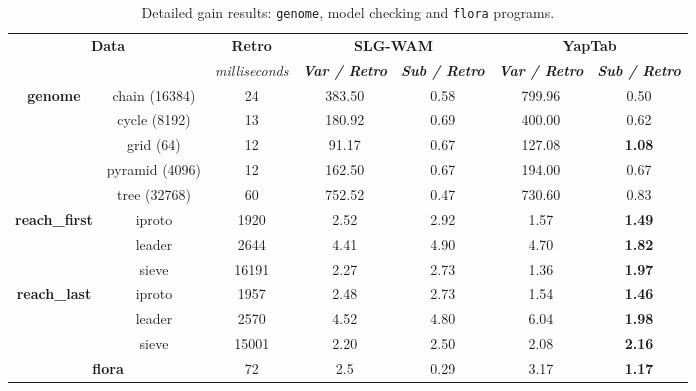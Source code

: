 \begin{table}[ht]
\centering
\footnotesize{
  \begin{tabular}{cc|c|cc|cc}
   \hline
    \hline
    \multicolumn{2}{c|}{\multirow{2}{*}{\small{\textbf{Data}}}} & \textbf{\small{Retro}} & \multicolumn{2}{c|}{\small{\textbf{SLG-WAM}}} & \multicolumn{2}{c}{\small{\textbf{YapTab}}} \\
     \multicolumn{2}{c|}{} & \scriptsize{\textit{milliseconds}} & \textbf{\textit{\scriptsize{Var / Retro}}} & \textbf{\textit{\scriptsize{Sub / Retro}}} & \textbf{\textit{\scriptsize{Var / Retro}}} & \textbf{\textit{\scriptsize{Sub / Retro}}} \\
   \hline
   \hline
   
   \multirow{5}{*}{\textbf{genome}} &  chain  (16384)  &  24 &  383.50  &  0.58  &  799.96 &  0.50 \\
   &  cycle  (8192)  &  13 &  180.92  &  0.69  &  400.00 &  0.62 \\
   &  grid  (64)  &  12 &  91.17  &  0.67  &  127.08 &  \textbf{1.08} \\
   &  pyramid  (4096)  &  12 &  162.50  &  0.67  &  194.00 &  0.67 \\
   &  tree  (32768)  &  60 &  752.52  &  0.47  &  730.60 &  0.83 \\
   \hline

   \multirow{3}{*}{\textbf{reach\_first}} &  iproto  &  1920 &  2.52  &  2.92  &  1.57 &  \textbf{1.49} \\
   &  leader  &  2644 &  4.41  &  4.90  &  4.70 &  \textbf{1.82} \\
   &  sieve  &  16191 &  2.27  &  2.73  &  1.36 &  \textbf{1.97} \\
   \hline
   \multirow{3}{*}{\textbf{reach\_last}} &  iproto  &  1957 &  2.48  &  2.73  &  1.54 &  \textbf{1.46} \\
   &  leader  &  2570 &  4.52  &  4.80  &  6.04 &  \textbf{1.98} \\
   &  sieve  &  15001 &  2.20  &  2.50  &  2.08 &  \textbf{2.16} \\
   \hline
\multicolumn{2}{c|}{\textbf{flora}} & 72 & 2.5 & 0.29 & 3.17 & \textbf{1.17} \\
\hline
\end{tabular}
}
\caption{Detailed gain results: \texttt{genome}, model checking and \texttt{flora} programs.}
\label{tbl:results_detail_gain_model}
\end{table}